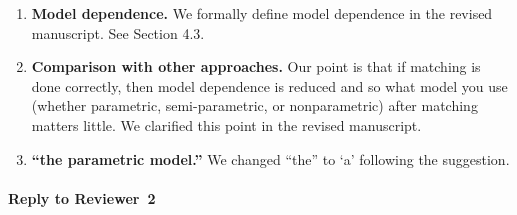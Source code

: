 \documentclass[11pt]{article}
\begin{document}
\begin{enumerate}
\item {\bf Model dependence.} We formally define model dependence in
  the revised manuscript. See Section 4.3.

\item {\bf Comparison with other approaches.} Our point is that if
  matching is done correctly, then model dependence is reduced and so
  what model you use (whether parametric, semi-parametric, or
  nonparametric) after matching matters little. We clarified this
  point in the revised manuscript.


\item {\bf ``the parametric model.''} We changed ``the'' to `a'
  following the suggestion.
\end{enumerate}


\paragraph{Reply to Reviewer~2}
\end{document}
